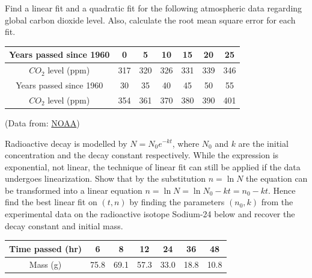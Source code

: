 \begin{Exercise}
Find a linear fit and a quadratic fit for the following atmospheric data regarding global carbon dioxide level. Also, calculate the root mean square error for each fit.
\begin{center}
\end{center}
\begin{center}
\begin{tabular}{|c|c|c|c|c|c|c|}
\hline
Years passed since 1960 & 0 & 5 & 10 & 15 & 20 & 25 \\
\hline
$CO_2$ level (ppm) & 317 & 320 & 326 & 331 & 339 & 346 \\
\hline
Years passed since 1960 & 30 & 35 & 40 & 45 & 50 & 55\\
\hline
$CO_2$ level (ppm) & 354 & 361 & 370 & 380 & 390 & 401\\
\hline
\end{tabular}
\end{center}
(Data from: \href{ftp://aftp.cmdl.noaa.gov/products/trends/co2/co2_annmean_mlo.txt}{NOAA})
\end{Exercise}

\begin{Exercise}
Radioactive decay is modelled by $N = N_0e^{-kt}$, where $N_0$ and $k$ are the initial concentration and the decay constant respectively. While the expression is exponential, not linear, the technique of linear fit can still be applied if the data undergoes linearization. Show that by the substitution $n = \ln N$ the equation can be transformed into a linear equation $n = \ln N = \ln N_0 - kt = n_0 - kt$. Hence find the best linear fit on $(t, n)$ by finding the parameters $(n_0, k)$ from the experimental data on the radioactive isotope Sodium-24 below and recover the decay constant and initial mass.
\begin{center}
\begin{tabular}{|c|c|c|c|c|c|c|}
\hline
Time passed (hr) & 6 & 8 & 12 & 24 & 36 & 48\\
\hline
Mass (g) & 75.8 & 69.1 & 57.3 & 33.0 & 18.8 & 10.8\\
\hline
\end{tabular}
\end{center}
\end{Exercise}

